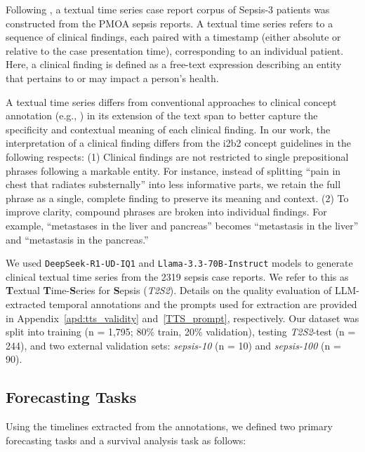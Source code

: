 \documentclass[letterpaper]{article} %
\begin{document}
Following \citeauthor{noroozizadeh2025reconstructing} \citeyearpar{noroozizadeh2025reconstructing}, a textual time series case report corpus of Sepsis-3 patients was constructed from the PMOA sepsis reports. A textual time series refers to a sequence of clinical findings, each paired with a timestamp (either absolute or relative to the case presentation time), corresponding to an individual patient. Here, a clinical finding is defined as a free-text expression describing an entity that pertains to or may impact a person's health.

A textual time series differs from conventional approaches to clinical concept annotation (e.g., \cite{sun2013evaluating,uzuner20112010}) in its extension of the text span to better capture the specificity and contextual meaning of each clinical finding. In our work, the interpretation of a clinical finding differs from the i2b2 concept guidelines in the following respects: (1) Clinical findings are not restricted to single prepositional phrases following a markable entity. For instance, instead of splitting “pain in chest that radiates substernally” into less informative parts, we retain the full phrase as a single, complete finding to preserve its meaning and context. (2) To improve clarity, compound phrases are broken into individual findings. For example, “metastases in the liver and pancreas” becomes “metastasis in the liver” and “metastasis in the pancreas.”

We used \texttt{DeepSeek-R1-UD-IQ1} and \texttt{Llama-3.3-70B-Instruct} models to generate clinical textual time series from the 2319 sepsis case reports. We refer to this as \textbf{T}extual \textbf{T}ime-\textbf{S}eries for \textbf{S}epsis (\textit{T2S2}).
Details on the quality evaluation of LLM-extracted temporal annotations and the prompts used for extraction are provided in Appendix~\ref{apd:tts_validity} and~\ref{TTS_prompt}, respectively.
Our dataset was split into training (n = 1,795; 80\% train, 20\% validation), testing \textit{T2S2}-test (n = 244), and two external validation sets: \textit{sepsis-10} (n = 10) and \textit{sepsis-100} (n = 90).

\subsection{Forecasting Tasks}
Using the timelines extracted from the annotations, we defined two primary forecasting tasks and a survival analysis task as follows:
\end{document}
